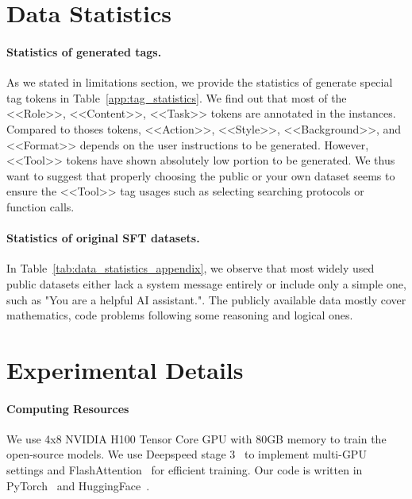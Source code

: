 



\section{Data Statistics}
\label{app:data_statistics_appendix}
\paragraph{Statistics of generated tags.} As we stated in limitations section, we provide the statistics of generate special tag tokens in Table~\ref{app:tag_statistics}.
We find out that most of the <<Role>>, <<Content>>, <<Task>> tokens are annotated in the instances.
Compared to thoses tokens, <<Action>>, <<Style>>, <<Background>>, and <<Format>> depends on the user instructions to be generated.
However, <<Tool>> tokens have shown absolutely low portion to be generated.
We thus want to suggest that properly choosing the public or your own dataset seems to ensure the <<Tool>> tag usages such as selecting searching protocols or function calls. 



\paragraph{Statistics of original SFT datasets.}
In Table~\ref{tab:data_statistics_appendix}, we observe that most widely used public datasets either lack a system message entirely or include only a simple one, such as "You are a helpful AI assistant.".
The publicly available data mostly cover mathematics, code problems following some reasoning and logical ones.




\section{Experimental Details}
\label{app:experimental_details}
\paragraph{Computing Resources}
We use 4x8 NVIDIA H100 Tensor Core GPU with 80GB memory to train the open-source models.
We use Deepspeed stage 3~\citep{rajbhandari2020zero} to implement multi-GPU settings and FlashAttention~\citep{dao2022flashattention} for efficient training.
Our code is written in PyTorch~\citep{paszke2019pytorch} and HuggingFace~\citep{wolf2019huggingface}.



